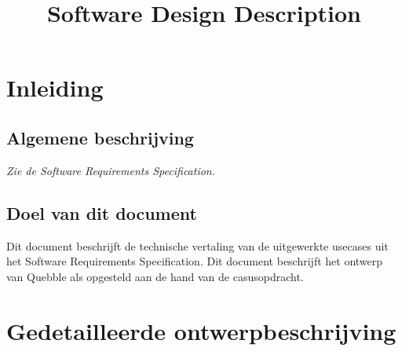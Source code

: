

\title{Software Design Description}





\clearpage\section{Inleiding}

\subsection{Algemene beschrijving}
\textit{Zie de Software Requirements Specification.}

\subsection{Doel van dit document}
Dit document beschrijft de technische vertaling van de uitgewerkte usecases uit het Software Requirements Specification. Dit document beschrijft het ontwerp van Quebble als opgesteld aan de hand van de casusopdracht.



\clearpage\section{Gedetailleerde ontwerpbeschrijving}

